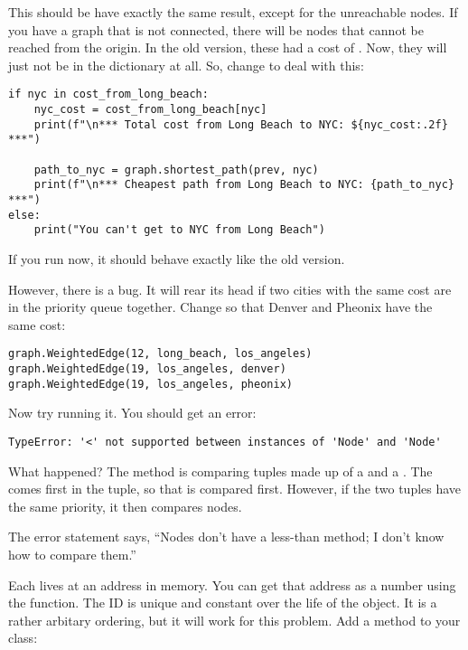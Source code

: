 This should be have exactly the same result, except for the unreachable nodes.
If you have a graph that is not connected, there will be nodes that
cannot be reached from the origin.  In the old version, these had a
cost of .  Now, they will just not be in the dictionary at all.  So, change  to deal with this:

\begin{verbatim}
if nyc in cost_from_long_beach:
    nyc_cost = cost_from_long_beach[nyc]
    print(f"\n*** Total cost from Long Beach to NYC: ${nyc_cost:.2f} ***")

    path_to_nyc = graph.shortest_path(prev, nyc)
    print(f"\n*** Cheapest path from Long Beach to NYC: {path_to_nyc} ***")
else:
    print("You can't get to NYC from Long Beach")
\end{verbatim}

If you run  now, it should behave exactly like the old version.

However, there is a bug. It will rear its head if two cities with the same
cost are in the priority queue together.  Change 
so that Denver and Pheonix have the same cost:

\begin{verbatim}
graph.WeightedEdge(12, long_beach, los_angeles)
graph.WeightedEdge(19, los_angeles, denver)
graph.WeightedEdge(19, los_angeles, pheonix)
\end{verbatim}

Now try running it.  You should get an error:

\begin{verbatim}
TypeError: '<' not supported between instances of 'Node' and 'Node'
\end{verbatim}

What happened? The  method is comparing
tuples made up of a  and a .  The
 comes first in the tuple, so that is compared
first. However, if the two tuples have the same priority, it then
compares nodes.

The error statement says, ``Nodes don't have a less-than method; I don't
know how to compare them.''

Each  lives at an address in memory. You can get that
address as a number using the  function. The ID is
unique and constant over the life of the object. It is a rather
arbitary ordering, but it will work for this problem.  Add a method to
your  class:


